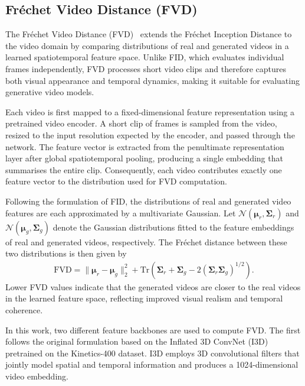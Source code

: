 \subsection{Fr\'echet Video Distance (FVD)}
\label{subsec:fvd}

The Fr\'echet Video Distance (FVD)~\cite{unterthiner2019fvd} extends the Fr\'echet Inception Distance to the video domain by comparing distributions of real and generated videos in a learned spatiotemporal feature space. Unlike FID, which evaluates individual frames independently, FVD processes short video clips and therefore captures both visual appearance and temporal dynamics, making it suitable for evaluating generative video models.

Each video is first mapped to a fixed-dimensional feature representation using a pretrained video encoder. A short clip of frames is sampled from the video, resized to the input resolution expected by the encoder, and passed through the network. The feature vector is extracted from the penultimate representation layer after global spatiotemporal pooling, producing a single embedding that summarises the entire clip. Consequently, each video contributes exactly one feature vector to the distribution used for FVD computation.

Following the formulation of FID, the distributions of real and generated video features are each approximated by a multivariate Gaussian. Let $\mathcal{N}(\boldsymbol{\mu}_r, \boldsymbol{\Sigma}_r)$ and $\mathcal{N}(\boldsymbol{\mu}_g, \boldsymbol{\Sigma}_g)$ denote the Gaussian distributions fitted to the feature embeddings of real and generated videos, respectively. The Fr\'echet distance between these two distributions is then given by
\begin{align}
    \text{FVD} = \|\boldsymbol{\mu}_r - \boldsymbol{\mu}_g\|_2^2 + \text{Tr}\!\left(\boldsymbol{\Sigma}_r + \boldsymbol{\Sigma}_g - 2\left(\boldsymbol{\Sigma}_r \boldsymbol{\Sigma}_g\right)^{1/2}\right).
    \label{eq:fvd}
\end{align}
Lower FVD values indicate that the generated videos are closer to the real videos in the learned feature space, reflecting improved visual realism and temporal coherence.

In this work, two different feature backbones are used to compute FVD. The first follows the original formulation based on the Inflated 3D ConvNet (I3D)~\cite{carreira2017quo} pretrained on the Kinetics-400 dataset. I3D employs 3D convolutional filters that jointly model spatial and temporal information and produces a 1024-dimensional video embedding.


